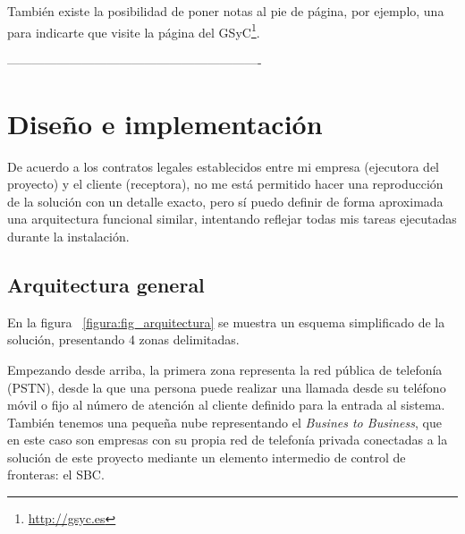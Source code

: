 \documentclass[a4paper, 12pt]{book}
\begin{document}
También existe la posibilidad de poner notas al pie de página, por ejemplo, una para indicarte que visite la página del GSyC\footnote{\url{http://gsyc.es}}.


-------------------------------------------------------------



\cleardoublepage
\chapter{Diseño e implementación}

De acuerdo a los contratos legales establecidos entre mi empresa (ejecutora del proyecto) y el cliente (receptora), no me está permitido hacer una reproducción de la solución con un detalle exacto, pero sí puedo definir de forma aproximada una arquitectura funcional similar, intentando reflejar todas mis tareas ejecutadas durante la instalación.

\section{Arquitectura general}
\label{sec:arquitectura}

En la figura ~\ref{figura:fig_arquitectura} se muestra un esquema simplificado de la solución, presentando 4 zonas delimitadas. 

Empezando desde arriba, la primera zona representa la red pública de telefonía (PSTN), desde la que una persona puede realizar una llamada desde su teléfono móvil o fijo al número de atención al cliente definido para la entrada al sistema. También tenemos una pequeña nube representando el \emph{Busines to Business}, que en este caso son empresas con su propia red de telefonía privada conectadas a la solución de este proyecto mediante un elemento intermedio de control de fronteras: el SBC.
\end{document}
